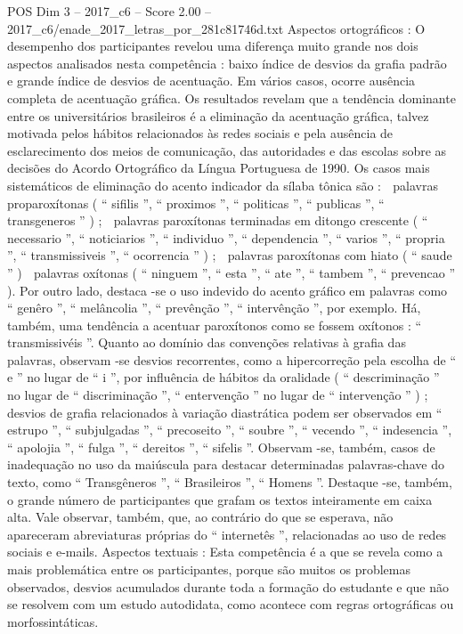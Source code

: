 \begin{textsample}{POS Dim 3 – 2017\_c6 – Score 2.00 – 2017\_c6/enade\_2017\_letras\_por\_281c81746d.txt}
Aspectos ortográficos : O desempenho dos participantes revelou uma diferença muito grande nos dois aspectos analisados nesta competência : baixo índice de desvios da grafia padrão e grande índice de desvios de acentuação.
Em vários casos, ocorre ausência completa de acentuação gráfica.
Os resultados revelam que a tendência dominante entre os universitários brasileiros é a eliminação da acentuação gráfica, talvez motivada pelos hábitos relacionados às redes sociais e pela ausência de esclarecimento dos meios de comunicação, das autoridades e das escolas sobre as decisões do Acordo Ortográfico da Língua Portuguesa de 1990.
Os casos mais sistemáticos de eliminação do acento indicador da sílaba tônica são :  palavras proparoxítonas ( “ sifilis ”, “ proximos ”, “ politicas ”, “ publicas ”, “ transgeneros ” ) ;  palavras paroxítonas terminadas em ditongo crescente ( “ necessario ”, “ noticiarios ”, “ individuo ”, “ dependencia ”, “ varios ”, “ propria ”, “ transmissiveis ”, “ ocorrencia ” ) ;  palavras paroxítonas com hiato ( “ saude ” )  palavras oxítonas ( “ ninguem ”, “ esta ”, “ ate ”, “ tambem ”, “ prevencao ” ).
Por outro lado, destaca -se o uso indevido do acento gráfico em palavras como “ genêro ”, “ melâncolia ”, “ prevênção ”, “ intervênção ”, por exemplo.
Há, também, uma tendência a acentuar paroxítonos como se fossem oxítonos : “ transmissivéis ”.
Quanto ao domínio das convenções relativas à grafia das palavras, observam -se desvios recorrentes, como a hipercorreção pela escolha de “ e ” no lugar de “ i ”, por influência de hábitos da oralidade ( “ descriminação ” no lugar de “ discriminação ”, “ entervenção ” no lugar de “ intervenção ” ) ; desvios de grafia relacionados à variação diastrática podem ser observados em “ estrupo ”, “ subjulgadas ”, “ precoseito ”, “ soubre ”, “ vecendo ”, “ indesencia ”, “ apolojia ”, “ fulga ”, “ dereitos ”, “ sifelis ”.
Observam -se, também, casos de inadequação no uso da maiúscula para destacar determinadas palavras-chave do texto, como “ Transgêneros ”, “ Brasileiros ”, “ Homens ”.
Destaque -se, também, o grande número de participantes que grafam os textos inteiramente em caixa alta.
Vale observar, também, que, ao contrário do que se esperava, não apareceram abreviaturas próprias do “ internetês ”, relacionadas ao uso de redes sociais e e-mails.
Aspectos textuais : Esta competência é a que se revela como a mais problemática entre os participantes, porque são muitos os problemas observados, desvios acumulados durante toda a formação do estudante e que não se resolvem com um estudo autodidata, como acontece com regras ortográficas ou morfossintáticas.

\end{textsample}
